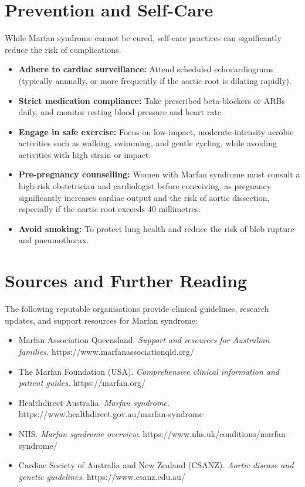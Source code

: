 \section*{Prevention and Self-Care}
While Marfan syndrome cannot be cured, self-care practices can significantly reduce the risk of complications.
\begin{itemize}
    \item \textbf{Adhere to cardiac surveillance:} Attend scheduled echocardiograms (typically annually, or more frequently if the aortic root is dilating rapidly).
    \item \textbf{Strict medication compliance:} Take prescribed beta-blockers or ARBs daily, and monitor resting blood pressure and heart rate.
    \item \textbf{Engage in safe exercise:} Focus on low-impact, moderate-intensity aerobic activities such as walking, swimming, and gentle cycling, while avoiding activities with high strain or impact.
    \item \textbf{Pre-pregnancy counselling:} Women with Marfan syndrome must consult a high-risk obstetrician and cardiologist before conceiving, as pregnancy significantly increases cardiac output and the risk of aortic dissection, especially if the aortic root exceeds 40 millimetres.
    \item \textbf{Avoid smoking:} To protect lung health and reduce the risk of bleb rupture and pneumothorax.
\end{itemize}

\section*{Sources and Further Reading}
The following reputable organisations provide clinical guidelines, research updates, and support resources for Marfan syndrome:
\begin{itemize}
    \item Marfan Association Queensland. \textit{Support and resources for Australian families.} https://www.marfanassociationqld.org/
    \item The Marfan Foundation (USA). \textit{Comprehensive clinical information and patient guides.} https://marfan.org/
    \item Healthdirect Australia. \textit{Marfan syndrome.} https://www.healthdirect.gov.au/marfan-syndrome
    \item NHS. \textit{Marfan syndrome overview.} https://www.nhs.uk/conditions/marfan-syndrome/
    \item Cardiac Society of Australia and New Zealand (CSANZ). \textit{Aortic disease and genetic guidelines.} https://www.csanz.edu.au/
\end{itemize}

